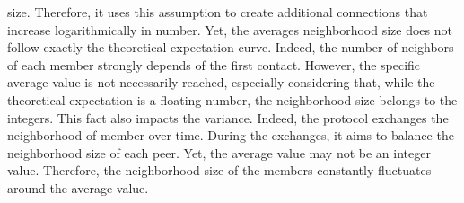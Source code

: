 \begin{asparadesc}
  size. Therefore, it uses this assumption to create additional connections that
  increase logarithmically in number. Yet, the averages neighborhood size does
  not follow exactly the theoretical expectation curve. Indeed, the number of
  neighbors of each member strongly depends of the first contact. However, the
  specific average value is not necessarily reached, especially considering
  that, while the theoretical expectation is a floating number, the neighborhood
  size belongs to the integers. This fact also impacts the variance. Indeed, the
  \SPRAY protocol exchanges the neighborhood of member over time. During the
  exchanges, it aims to balance the neighborhood size of each peer. Yet, the
  average value may not be an integer value. Therefore, the neighborhood size of
  the members constantly fluctuates around the average value.
\end{asparadesc}

\ \\

